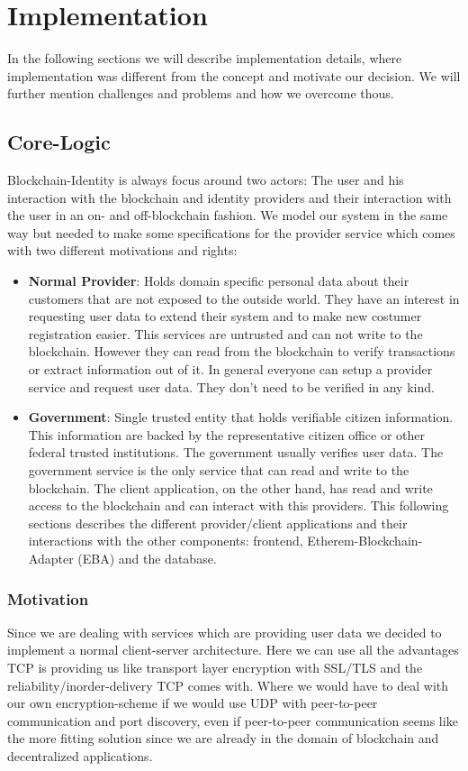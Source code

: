 \chapter{Implementation}
\label{cha:implementation}

In the following sections we will describe implementation details, where implementation was different from the concept and motivate our decision. 
We will further mention challenges and problems and how we overcome thous. 

\section{Core-Logic}
Blockchain-Identity is always focus around two actors: The user and his interaction with the blockchain and identity providers and their interaction with the user in an on- and off-blockchain fashion. We model our system in the same way but needed to make some specifications for the provider service which comes with two different motivations and rights:

\begin{itemize}
\item \textbf{Normal Provider}: Holds domain specific personal data about their customers that are not exposed to the outside world. They have an interest in requesting user data to extend their system and to make new costumer registration easier. This services are untrusted and can not write to the blockchain. However they can read from the blockchain to verify transactions or extract information out of it. In general everyone can setup a provider service and request user data. They don’t need to be verified in any kind. 
\item \textbf{Government}: Single trusted entity that holds verifiable citizen information. This information are backed by the representative citizen office or other federal trusted institutions. The government usually verifies user data.
The government service is the only service that can read and write to the blockchain. 
The client application, on the other hand, has read and write access to the blockchain and can interact with this providers.
This following sections describes the different provider/client applications and their interactions with the other components: frontend, Etherem-Blockchain-Adapter (EBA) and the database.
\end{itemize}

\subsection{Motivation}
Since we are dealing with services which are providing user data we decided to implement a normal client-server architecture. Here we can use all the advantages TCP is providing us like transport layer encryption with SSL/TLS and the reliability/inorder-delivery TCP comes with. Where we would have to deal with our own encryption-scheme if we would use UDP with peer-to-peer communication and port discovery, even if peer-to-peer communication seems like the more fitting solution since we are already in the domain of blockchain and decentralized applications. 

